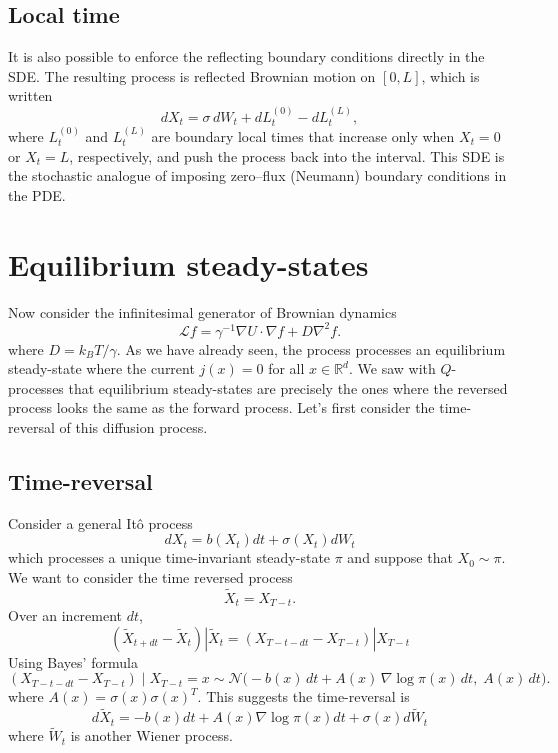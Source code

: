 \documentclass[11pt]{article}
\begin{document}
\subsection*{Local time}
It is also possible to enforce the reflecting boundary conditions directly in the SDE. The resulting process is reflected Brownian motion on $[0,L]$, which is written
\begin{equation}
dX_t = \sigma\, dW_t + dL_t^{(0)} - dL_t^{(L)},
\end{equation}
where $L_t^{(0)}$ and $L_t^{(L)}$ are boundary local times that increase only when $X_t=0$ or $X_t=L$, respectively, and push the process back into the interval. This SDE is the stochastic analogue of imposing zero–flux (Neumann) boundary conditions in the PDE.


\section*{Equilibrium steady-states}


Now consider the infinitesimal generator of Brownian dynamics
\begin{equation}\label{eq:brownian_generator}
\mathcal L f = \gamma^{-1} \nabla U \cdot \nabla f + D \nabla^2 f.
\end{equation}
where $D = k_BT/\gamma$. As we have already seen, the process processes an equilibrium steady-state where the current $j(x)=0$ for all $x \in {\mathbb R}^d$. We saw with $Q$-processes that equilibrium steady-states are precisely the ones where the reversed process looks the same as the forward process. Let's first consider the time-reversal of this diffusion process. 


\subsection*{Time-reversal}
Consider a general It\^o process
\begin{equation}
dX_t = b(X_t)dt + \sigma(X_t)dW_t
\end{equation}
which processes a unique time-invariant  steady-state $\pi$ and suppose that $X_0 \sim \pi$. We want to consider the time reversed process
\begin{equation}
\tilde{X}_t = X_{T-t}. 
\end{equation}
Over an increment $dt$,
\begin{equation}
(\tilde{X}_{t+dt} - \tilde{X}_t)|\tilde{X}_t  = (X_{T-t-dt} - X_{T-t})|X_{T-t} 
\end{equation}
Using Bayes' formula 
\begin{equation}
(X_{T-t-dt} - X_{T-t}) \mid X_{T-t}=x
\sim 
\mathcal N\big(-b(x)\,dt + A(x)\,\nabla \log\pi(x)\,dt,\; A(x)\,dt\big).
\end{equation}
where $A(x) = \sigma(x)\sigma(x)^T$. This suggests the time-reversal is 
\begin{equation}
d\tilde{X}_t = -b(x)dt + A(x)\nabla \log\pi(x)dt + \sigma(x)d\tilde{W}_t
\end{equation}
where $\tilde{W}_t$ is another Wiener process. 
\end{document}
